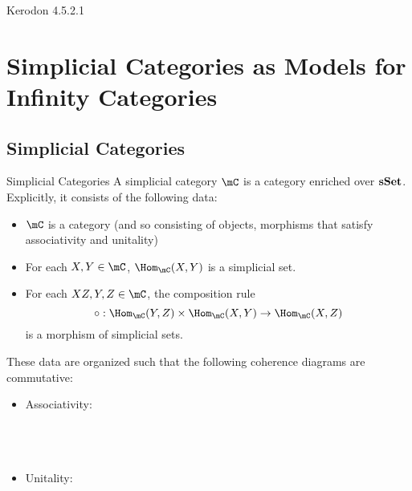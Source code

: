 \documentclass[a4paper]{article}
\begin{document}
Kerodon 4.5.2.1

\pagebreak
\section{Simplicial Categories as Models for Infinity Categories}
\subsection{Simplicial Categories}
\begin{defn}{Simplicial Categories}{} A simplicial category $\mC$ is a category enriched over $\bold{sSet}$. Explicitly, it consists of the following data: 
\begin{itemize}
\item $\mC$ is a category (and so consisting of objects, morphisms that satisfy associativity and unitality)
\item For each $X,Y\in\mC$, $\Hom_\mC(X,Y)$ is a simplicial set. 
\item For each $XZ,Y,Z\in\mC$, the composition rule $$\circ:\Hom_\mC(Y,Z)\times\Hom_\mC(X,Y)\to\Hom_\mC(X,Z)$$ is a morphism of simplicial sets. 
\end{itemize}
These data are organized such that the following coherence diagrams are commutative: 
\begin{itemize}
\item Associativity: \\~\\
\\~\\
\item Unitality: \\~\\
\\~\\
\end{itemize}
\end{defn}
\end{document}
